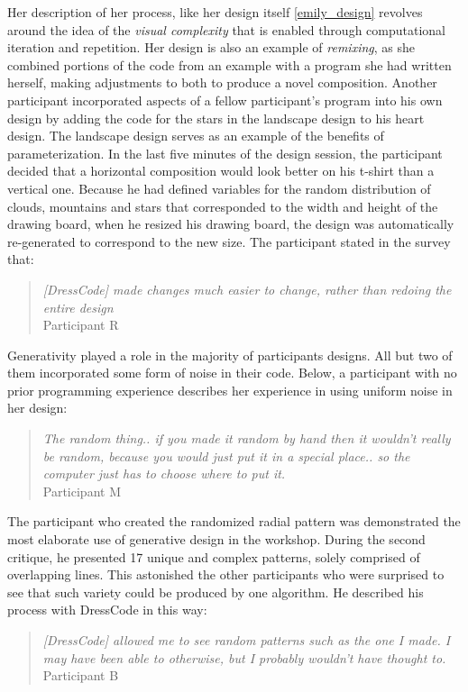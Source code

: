 \documentclass{sigchi}
\begin{document}
Her description of her process, like her design itself \ref{emily_design} revolves around the idea of the \textit{visual complexity} that is enabled through computational iteration and repetition. Her design is also an example of \textit{remixing}, as she combined portions of the code from an example with a program she had written herself, making adjustments to both to produce a novel composition. Another participant incorporated aspects of a fellow participant's program into his own design by adding the code for the stars in the landscape design to his heart design. The landscape design serves as an example of the benefits of parameterization. In the last five minutes of the design session, the participant decided that a horizontal composition would look better on his t-shirt than a vertical one. Because he had defined variables for the random distribution of clouds, mountains and stars that corresponded to the width and height of the drawing board, when he resized his drawing board, the design was automatically re-generated to correspond to the new size. The participant stated in the survey that:
\begin{quotation}
	\textit{[DressCode] made changes much easier to change, rather than redoing the entire design}
	\\Participant R
\end{quotation}
Generativity played a role in the majority of participants designs. All but two of them incorporated some form of noise in their code. Below, a participant with no prior programming experience describes her experience in using uniform noise in her design:
\begin{quotation}
	\textit{The random thing.. if you made it random by hand then it wouldn't really be random, because you would just put it in a special place.. so the computer just has to choose where to put it.}
		\\Participant M
\end{quotation}
The participant who created the randomized radial pattern was demonstrated the most elaborate use of generative design in the workshop. During the second critique, he presented 17 unique and complex patterns, solely comprised of overlapping lines. This astonished the other participants who were surprised to see that such variety could be produced by one algorithm. He described his process with DressCode in this way:
\begin{quotation} \emph{[DressCode] allowed me to see random patterns such as the one I made. I may have been able to otherwise, but I probably wouldn't have thought to.}
		\\Participant B
	\end{quotation}
\end{document}
